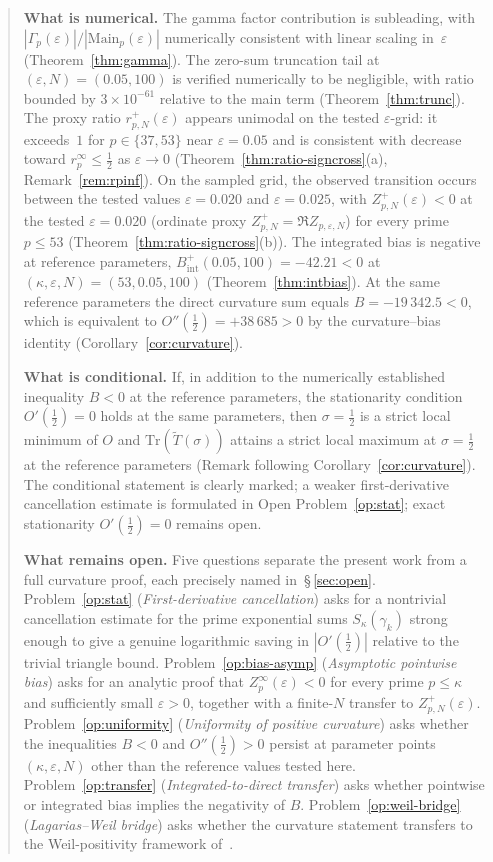 \documentclass[11pt]{article}
\newcommand{\Tt}{\widetilde{T}}
\begin{document}
\begin{abstract}
\textbf{What is numerical.}
The gamma factor contribution is subleading, with
$|\Gamma_p(\varepsilon)|/|\mathrm{Main}_p(\varepsilon)|$ numerically
consistent with linear scaling in~$\varepsilon$
(Theorem~\ref{thm:gamma}).
The zero-sum truncation tail at $(\varepsilon,N)=(0.05,100)$ is
verified numerically to be negligible, with ratio bounded by
$3\times10^{-61}$ relative to the main term (Theorem~\ref{thm:trunc}).
The proxy ratio $r^+_{p,N}(\varepsilon)$ appears unimodal on the
tested $\varepsilon$-grid:
it exceeds~$1$ for $p\in\{37,53\}$ near $\varepsilon=0.05$ and
is consistent with decrease toward $r_p^{\infty}\le\tfrac12$
as $\varepsilon\to 0$
(Theorem~\ref{thm:ratio-signcross}(a), Remark~\ref{rem:rpinf}).
On the sampled grid, the observed transition occurs between the
tested values $\varepsilon=0.020$ and $\varepsilon=0.025$, with
$Z_{p,N}^+(\varepsilon)<0$ at the tested $\varepsilon=0.020$
(ordinate proxy $Z_{p,N}^+=\Re Z_{p,\varepsilon,N}$)
for every prime $p\le 53$ (Theorem~\ref{thm:ratio-signcross}(b)).
The integrated bias is negative at reference parameters,
$B_{\mathrm{int}}^+(0.05,100)=-42.21<0$ at
$(\kappa,\varepsilon,N)=(53,0.05,100)$ (Theorem~\ref{thm:intbias}).
At the same reference parameters the direct curvature sum equals
$B=-19\,342.5<0$, which is equivalent to
$O''(\tfrac12)=+38\,685>0$ by the curvature--bias identity
(Corollary~\ref{cor:curvature}).

\textbf{What is conditional.}
If, in addition to the numerically established inequality $B<0$ at the
reference parameters, the stationarity condition $O'(\tfrac12)=0$
holds at the same parameters, then $\sigma=\tfrac12$ is a strict local
minimum of $O$ and $\mathrm{Tr}(\Tt(\sigma))$ attains a strict local
maximum at $\sigma=\tfrac12$ at the reference parameters
(Remark following Corollary~\ref{cor:curvature}).
The conditional statement is clearly marked;
a weaker first-derivative cancellation estimate is formulated in
Open Problem~\ref{op:stat}; exact stationarity $O'(\tfrac12)=0$
remains open.

\textbf{What remains open.}
Five questions separate the present work from a full curvature proof,
each precisely named in~\S\,\ref{sec:open}.
Problem~\ref{op:stat} (\emph{First-derivative cancellation}) asks for
a nontrivial cancellation estimate for the prime exponential sums
$S_\kappa(\gamma_k)$ strong enough to give a genuine logarithmic
saving in $|O'(\tfrac12)|$ relative to the trivial triangle bound.
Problem~\ref{op:bias-asymp} (\emph{Asymptotic pointwise bias}) asks
for an analytic proof that $Z_p^\infty(\varepsilon)<0$ for every prime
$p\le\kappa$ and sufficiently small $\varepsilon>0$, together with a
finite-$N$ transfer to $Z_{p,N}^+(\varepsilon)$.
Problem~\ref{op:uniformity} (\emph{Uniformity of positive curvature})
asks whether the inequalities $B<0$ and $O''(\tfrac12)>0$ persist at
parameter points $(\kappa,\varepsilon,N)$ other than the reference
values tested here.
Problem~\ref{op:transfer} (\emph{Integrated-to-direct transfer}) asks
whether pointwise or integrated bias implies the negativity of $B$.
Problem~\ref{op:weil-bridge} (\emph{Lagarias--Weil bridge}) asks whether
the curvature statement transfers to the Weil-positivity framework
of~\cite{Lagarias}.


\end{abstract}
\end{document}
